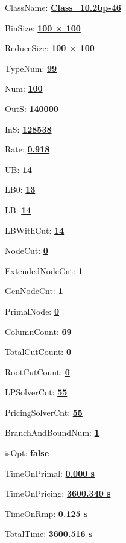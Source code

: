 \documentclass[11pt]{article}
\begin{document}
\pagestyle{empty}


ClassName: \underline{\textbf{Class_10.2bp-46}}
\par
BinSize: \underline{\textbf{100 × 100}}
\par
ReduceSize: \underline{\textbf{100 × 100}}
\par
TypeNum: \underline{\textbf{99}}
\par
Num: \underline{\textbf{100}}
\par
OutS: \underline{\textbf{140000}}
\par
InS: \underline{\textbf{128538}}
\par
Rate: \underline{\textbf{0.918}}
\par
UB: \underline{\textbf{14}}
\par
LB0: \underline{\textbf{13}}
\par
LB: \underline{\textbf{14}}
\par
LBWithCut: \underline{\textbf{14}}
\par
NodeCut: \underline{\textbf{0}}
\par
ExtendedNodeCnt: \underline{\textbf{1}}
\par
GenNodeCnt: \underline{\textbf{1}}
\par
PrimalNode: \underline{\textbf{0}}
\par
ColumnCount: \underline{\textbf{69}}
\par
TotalCutCount: \underline{\textbf{0}}
\par
RootCutCount: \underline{\textbf{0}}
\par
LPSolverCnt: \underline{\textbf{55}}
\par
PricingSolverCnt: \underline{\textbf{55}}
\par
BranchAndBoundNum: \underline{\textbf{1}}
\par
isOpt: \underline{\textbf{false}}
\par
TimeOnPrimal: \underline{\textbf{0.000 s}}
\par
TimeOnPricing: \underline{\textbf{3600.340 s}}
\par
TimeOnRmp: \underline{\textbf{0.125 s}}
\par
TotalTime: \underline{\textbf{3600.516 s}}
\par
\newpage


\end{document}
